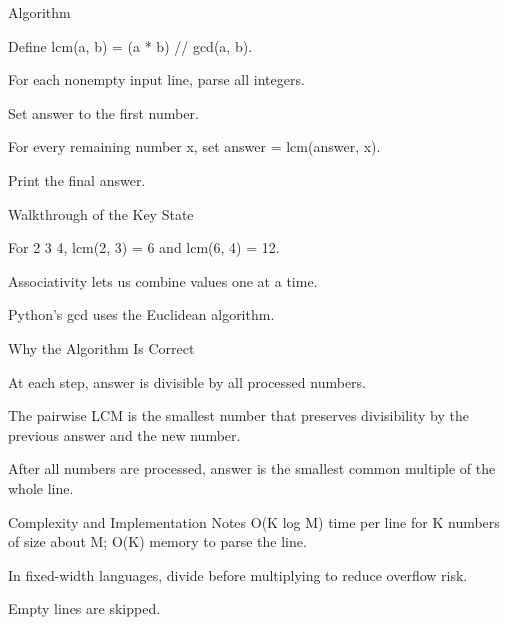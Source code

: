 \documentclass[aspectratio=169,11pt]{beamer}
\begin{document}
\begin{frame}{Algorithm}
\begin{tightitemize}
  \item Define lcm(a, b) = (a * b) // gcd(a, b).
  \item For each nonempty input line, parse all integers.
  \item Set answer to the first number.
  \item For every remaining number x, set answer = lcm(answer, x).
  \item Print the final answer.
\end{tightitemize}
\end{frame}

\begin{frame}{Walkthrough of the Key State}
\begin{tightitemize}
  \item For 2 3 4, lcm(2, 3) = 6 and lcm(6, 4) = 12.
  \item Associativity lets us combine values one at a time.
  \item Python's gcd uses the Euclidean algorithm.
\end{tightitemize}
\end{frame}

\begin{frame}{Why the Algorithm Is Correct}
\begin{tightitemize}
  \item At each step, answer is divisible by all processed numbers.
  \item The pairwise LCM is the smallest number that preserves divisibility by the previous answer and the new number.
  \item After all numbers are processed, answer is the smallest common multiple of the whole line.
\end{tightitemize}
\end{frame}

\begin{frame}{Complexity and Implementation Notes}
\small
{} O(K log M) time per line for K numbers of size about M; O(K) memory to parse the line.

\vspace{0.3cm}
\begin{tightitemize}
  \item In fixed-width languages, divide before multiplying to reduce overflow risk.
  \item Empty lines are skipped.
\end{tightitemize}
\end{frame}
\end{document}
